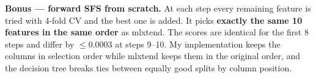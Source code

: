 \documentclass[11pt]{article}
\begin{document}
\textbf{Bonus --- forward SFS from scratch.} At each step every remaining feature is tried with 4-fold CV and the best one is added. It picks
\textbf{exactly the same 10 features in the same order} as mlxtend. The scores are identical for the first 8 steps and differ by
$\le0.0003$ at steps 9--10. My implementation keeps the columns in selection order while mlxtend keeps them in the original order, and the
decision tree breaks ties between equally good splits by column position.
\end{document}
